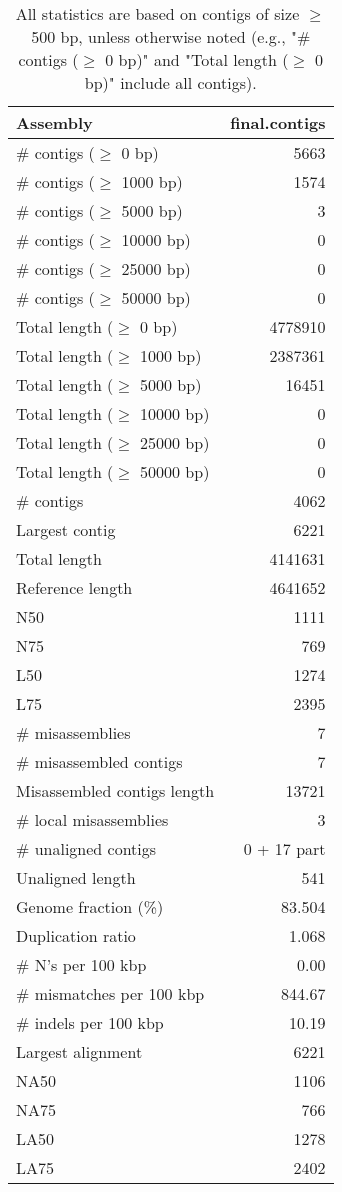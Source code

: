 \documentclass[12pt,a4paper]{article}
\begin{document}
\begin{table}[ht]
\begin{center}
\caption{All statistics are based on contigs of size $\geq$ 500 bp, unless otherwise noted (e.g., "\# contigs ($\geq$ 0 bp)" and "Total length ($\geq$ 0 bp)" include all contigs).}
\begin{tabular}{|l*{1}{|r}|}
\hline
Assembly & final.contigs \\ \hline
\# contigs ($\geq$ 0 bp) & 5663 \\ \hline
\# contigs ($\geq$ 1000 bp) & 1574 \\ \hline
\# contigs ($\geq$ 5000 bp) & 3 \\ \hline
\# contigs ($\geq$ 10000 bp) & 0 \\ \hline
\# contigs ($\geq$ 25000 bp) & 0 \\ \hline
\# contigs ($\geq$ 50000 bp) & 0 \\ \hline
Total length ($\geq$ 0 bp) & 4778910 \\ \hline
Total length ($\geq$ 1000 bp) & 2387361 \\ \hline
Total length ($\geq$ 5000 bp) & 16451 \\ \hline
Total length ($\geq$ 10000 bp) & 0 \\ \hline
Total length ($\geq$ 25000 bp) & 0 \\ \hline
Total length ($\geq$ 50000 bp) & 0 \\ \hline
\# contigs & 4062 \\ \hline
Largest contig & 6221 \\ \hline
Total length & 4141631 \\ \hline
Reference length & 4641652 \\ \hline
N50 & 1111 \\ \hline
N75 & 769 \\ \hline
L50 & 1274 \\ \hline
L75 & 2395 \\ \hline
\# misassemblies & 7 \\ \hline
\# misassembled contigs & 7 \\ \hline
Misassembled contigs length & 13721 \\ \hline
\# local misassemblies & 3 \\ \hline
\# unaligned contigs & 0 + 17 part \\ \hline
Unaligned length & 541 \\ \hline
Genome fraction (\%) & 83.504 \\ \hline
Duplication ratio & 1.068 \\ \hline
\# N's per 100 kbp & 0.00 \\ \hline
\# mismatches per 100 kbp & 844.67 \\ \hline
\# indels per 100 kbp & 10.19 \\ \hline
Largest alignment & 6221 \\ \hline
NA50 & 1106 \\ \hline
NA75 & 766 \\ \hline
LA50 & 1278 \\ \hline
LA75 & 2402 \\ \hline
\end{tabular}
\end{center}
\end{table}
\end{document}
